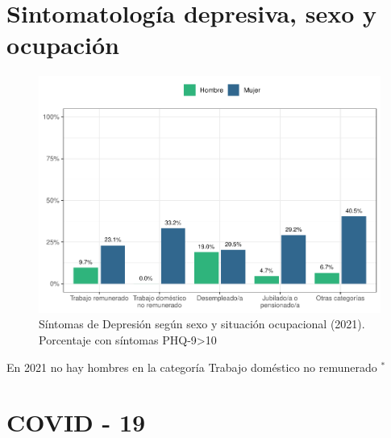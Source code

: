 \documentclass[
  12pt,
  openany]{book}
\begin{document}
\hypertarget{sintomatologuxeda-depresiva-sexo-y-ocupaciuxf3n}{%
\section{Sintomatología depresiva, sexo y ocupación}\label{sintomatologuxeda-depresiva-sexo-y-ocupaciuxf3n}}

\begin{figure}

{\centering \includegraphics{reporte-elsoc_files/figure-latex/depre-labstat-1} 

}

\caption{Síntomas de Depresión según sexo y situación ocupacional (2021). Porcentaje con síntomas PHQ-9>10}\label{fig:depre-labstat}
\end{figure}

En 2021 no hay hombres en la categoría Trabajo doméstico no remunerado \(^{*}\)

\hypertarget{covid---19}{%
\section{COVID - 19}\label{covid---19}}
\end{document}
